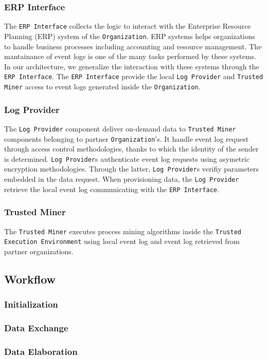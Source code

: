 \subsubsection{ERP Interface}
The \texttt{ERP Interface} collects the logic to interact with the Enterprise Resource Planning (ERP) system  of the \texttt{Organization}. ERP systems helps organizations to
handle business processes including accounting and resource management. The mantainance of event logs is one of the many tasks performed by these systems. In our architecture, we generalize the interaction with these systems through the \texttt{ERP Interface}. The \texttt{ERP Interface} provide the local \texttt{Log Provider} and \texttt{Trusted Miner} access to event logs generated inside the \texttt{Organization}.
\subsubsection{Log Provider}
The \texttt{Log Provider} component deliver on-demand data to \texttt{Trusted Miner} components belonging to partner \texttt{Organization}'s. It handle event log request through access control methodologies, thanks to which the identity of the sender is determined. \texttt{Log Provider}s authenticate event log requests using asymetric encryption methodologies. Through the latter, \texttt{Log Provider}s verifiy parameters embedded in the data request. When provisioning data, the \texttt{Log Provider} retrieve the local event log communicating with the \texttt{ERP Interface}.

\subsubsection{Trusted Miner}
 The \texttt{Trusted Miner} executes process mining algorithms inside the \texttt{Trusted Execution Environment} using local event log and event log retrieved from partner organizations.
\subsection{Workflow}
\subsubsection{Initialization}
\subsubsection{Data Exchange}
\subsubsection{Data Elaboration}



